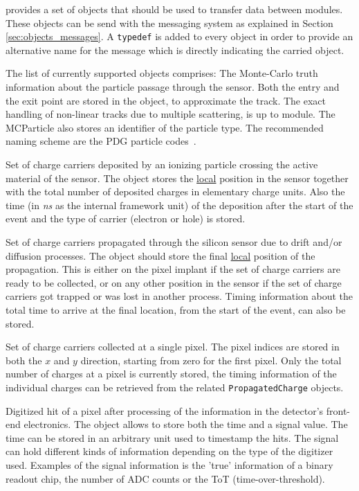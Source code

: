 \apsq provides a set of objects that should be used to transfer data between modules.
These objects can be send with the messaging system as explained in Section \ref{sec:objects_messages}.
A \texttt{typedef} is added to every object in order to provide an alternative name for the message which is directly indicating the carried object.

The list of currently supported objects comprises:
The Monte-Carlo truth information about the particle passage through the sensor.
Both the entry and the exit point are stored in the object, to approximate the track.
The exact handling of non-linear tracks due to multiple scattering, is up to module.
The MCParticle also stores an identifier of the particle type.
The recommended naming scheme are the PDG particle codes~\cite{pdg}.

Set of charge carriers deposited by an ionizing particle crossing the active material of the sensor.
The object stores the \underline{local} position in the sensor together with the total number of deposited charges in elementary charge units.
Also the time (in \textit{ns} as the internal framework unit) of the deposition after the start of the event and the type of carrier (electron or hole) is stored.

Set of charge carriers propagated through the silicon sensor due to drift and/or diffusion processes.
The object should store the final \underline{local} position of the propagation.
This is either on the pixel implant if the set of charge carriers are ready to be collected, or on any other position in the sensor if the set of charge carriers got trapped or was lost in another process.
Timing information about the total time to arrive at the final location, from the start of the event, can also be stored.

Set of charge carriers collected at a single pixel.
The pixel indices are stored in both the $x$ and $y$ direction, starting from zero for the first pixel.
Only the total number of charges at a pixel is currently stored, the timing information of the individual charges can be retrieved from the related \texttt{PropagatedCharge} objects.

Digitized hit of a pixel after processing of the information in the detector's front-end electronics.
The object allows to store both the time and a signal value.
The time can be stored in an arbitrary unit used to timestamp the hits.
The signal can hold different kinds of information depending on the type of the digitizer used.
Examples of the signal information is the 'true' information of a binary readout chip, the number of ADC counts or the ToT (time-over-threshold).
